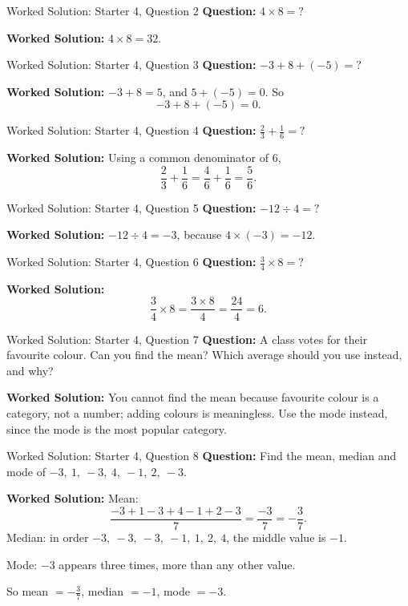 \documentclass{beamer}
\begin{document}
\begin{frame}{Worked Solution: Starter 4, Question 2}
\small
\textbf{Question:} \(4 \times 8=\mathord{?}\)

\smallskip
\textbf{Worked Solution:} \(4 \times 8 = 32\).
\end{frame}

\begin{frame}{Worked Solution: Starter 4, Question 3}
\small
\textbf{Question:} \(-3+8+(-5)=\mathord{?}\)

\smallskip
\textbf{Worked Solution:} \(-3+8=5\), and \(5+(-5)=0\). So
\[
-3+8+(-5)=0.
\]
\end{frame}

\begin{frame}{Worked Solution: Starter 4, Question 4}
\small
\textbf{Question:} \(\frac23+\frac16=\mathord{?}\)

\smallskip
\textbf{Worked Solution:} Using a common denominator of \(6\),
\[
\frac23+\frac16=\frac46+\frac16=\frac56.
\]
\end{frame}

\begin{frame}{Worked Solution: Starter 4, Question 5}
\small
\textbf{Question:} \(-12 \div 4=\mathord{?}\)

\smallskip
\textbf{Worked Solution:} \(-12 \div 4 = -3\), because \(4 \times (-3)=-12\).
\end{frame}

\begin{frame}{Worked Solution: Starter 4, Question 6}
\small
\textbf{Question:} \(\frac34 \times 8=\mathord{?}\)

\smallskip
\textbf{Worked Solution:}
\[
\frac34 \times 8 = \frac{3\times8}{4}=\frac{24}{4}=6.
\]
\end{frame}

\begin{frame}{Worked Solution: Starter 4, Question 7}
\small
\textbf{Question:} A class votes for their favourite colour. Can you find the mean? Which average should you use instead, and why?

\smallskip
\textbf{Worked Solution:} You cannot find the mean because favourite colour is a category, not a number; adding colours is meaningless. Use the mode instead, since the mode is the most popular category.
\end{frame}

\begin{frame}{Worked Solution: Starter 4, Question 8}
\small
\textbf{Question:} Find the mean, median and mode of \(-3,\ 1,\ -3,\ 4,\ -1,\ 2,\ -3\).

\smallskip
\textbf{Worked Solution:} Mean:
\[
\frac{-3+1-3+4-1+2-3}{7}=\frac{-3}{7}=-\frac37.
\]
Median: in order \(-3,\ -3,\ -3,\ -1,\ 1,\ 2,\ 4\), the middle value is \(-1\).

Mode: \(-3\) appears three times, more than any other value.

So mean \(=-\frac37\), median \(=-1\), mode \(=-3\).
\end{frame}
\end{document}
